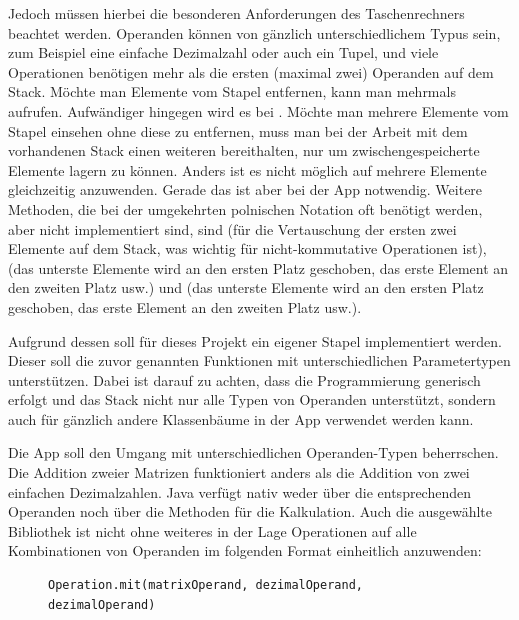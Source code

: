Jedoch müssen hierbei die besonderen Anforderungen des Taschenrechners beachtet werden. Operanden können von gänzlich unterschiedlichem Typus sein, zum Beispiel eine einfache Dezimalzahl oder auch ein Tupel, und viele Operationen benötigen mehr als die ersten (maximal zwei) Operanden auf dem Stack. Möchte man Elemente vom Stapel entfernen, kann man  mehrmals aufrufen. Aufwändiger hingegen wird es bei . Möchte man mehrere Elemente vom Stapel einsehen ohne diese zu entfernen, muss man bei der Arbeit mit dem vorhandenen Stack einen weiteren bereithalten, nur um zwischengespeicherte Elemente lagern zu können. Anders ist es nicht möglich  auf mehrere Elemente gleichzeitig anzuwenden. Gerade das ist aber bei der App notwendig. Weitere Methoden, die bei der umgekehrten polnischen Notation oft benötigt werden, aber nicht implementiert sind, sind  (für die Vertauschung der ersten zwei Elemente auf dem Stack, was wichtig für nicht-kommutative Operationen ist),  (das unterste Elemente wird an den ersten Platz geschoben, das erste Element an den zweiten Platz usw.) und  (das unterste Elemente wird an den ersten Platz geschoben, das erste Element an den zweiten Platz usw.).

Aufgrund dessen soll für dieses Projekt ein eigener Stapel implementiert werden. Dieser soll die zuvor genannten Funktionen mit unterschiedlichen Parametertypen unterstützen. Dabei ist darauf zu achten, dass die Programmierung generisch erfolgt und das Stack nicht nur alle Typen von Operanden unterstützt, sondern auch für gänzlich andere Klassenbäume in der App verwendet werden kann.

Die App soll den Umgang mit unterschiedlichen Operanden-Typen beherrschen. Die Addition zweier Matrizen funktioniert anders als die Addition von zwei einfachen Dezimalzahlen. Java verfügt nativ weder über die entsprechenden Operanden noch über die Methoden für die Kalkulation. Auch die ausgewählte Bibliothek ist nicht ohne weiteres in der Lage Operationen auf alle Kombinationen von Operanden im folgenden Format einheitlich anzuwenden:

\begin{figure}[bht]
	\begin{lstlisting}[caption=Konzept für Nutzung generischer Schnittstelle, label=list:konzept-fuer-nutzung-generischer-schnittstelle]
	Operation.mit(matrixOperand, dezimalOperand, dezimalOperand)
	\end{lstlisting}    
\end{figure}

